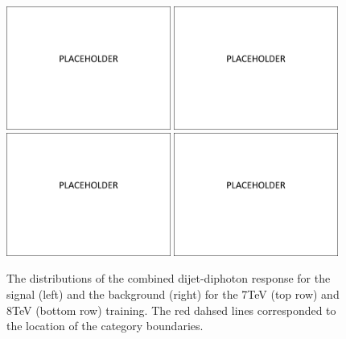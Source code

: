 \begin{figure}
  \includegraphics[width=0.48\textwidth]{placeholder.pdf}
  \includegraphics[width=0.48\textwidth]{placeholder.pdf} \\
  \includegraphics[width=0.48\textwidth]{placeholder.pdf}
  \includegraphics[width=0.48\textwidth]{placeholder.pdf}
  \caption{The distributions of the combined dijet-diphoton \BDT response for the \VBF signal (left) and the background (right) for the 7TeV (top row) and 8TeV (bottom row) training. The red dahsed lines corresponded to the location of the category boundaries.}
  \label{fig:vbf_dijet_comb}
\end{figure}

